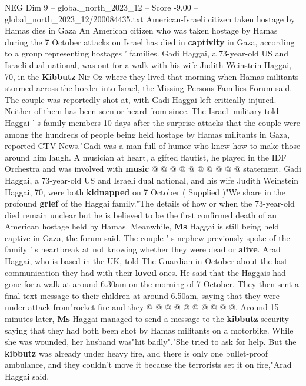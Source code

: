 \begin{textsample}{NEG Dim 9 – global\_north\_2023\_12 – Score -9.00 – global\_north\_2023\_12/200084435.txt}  \label{ex:f9_neg_071}
American-Israeli citizen taken hostage by Hamas dies in Gaza An American citizen who was taken hostage by Hamas during the 7 October attacks on Israel has died in \textbf{captivity} in Gaza, according to a group representing hostages ' families.
Gadi Haggai, a 73-year-old US and Israeli dual national, was out for a walk with his wife Judith Weinstein Haggai, 70, in the \textbf{Kibbutz} Nir Oz where they lived that morning when Hamas militants stormed across the border into Israel, the Missing Persons Families Forum said.
The couple was reportedly shot at, with Gadi Haggai left critically injured.
Neither of them has been seen or heard from since.
The Israeli military told Haggai ' s family members 10 days after the surprise attacks that the couple were among the hundreds of people being held hostage by Hamas militants in Gaza, reported CTV News."Gadi was a man full of humor who knew how to make those around him laugh.
A musician at heart, a gifted flautist, he played in the IDF Orchestra and was involved with \textbf{music} @ @ @ @ @ @ @ @ @ @ statement.
Gadi Haggai, a 73-year-old US and Israeli dual national, and his wife Judith Weinstein Haggai, 70, were both \textbf{kidnapped} on 7 October ( Supplied )"We share in the profound \textbf{grief} of the Haggai family."The details of how or when the 73-year-old died remain unclear but he is believed to be the first confirmed death of an American hostage held by Hamas.
Meanwhile, \textbf{Ms} Haggai is still being held captive in Gaza, the forum said.
The couple ' s nephew previously spoke of the family ' s heartbreak at not knowing whether they were dead or \textbf{alive}.
Arad Haggai, who is based in the UK, told The Guardian in October about the last communication they had with their \textbf{loved} ones.
He said that the Haggais had gone for a walk at around 6.30am on the morning of 7 October.
They then sent a final text message to their children at around 6.50am, saying that they were under attack from"rocket fire and they @ @ @ @ @ @ @ @ @ @.
Around 15 minutes later, \textbf{Ms} Haggai managed to send a message to the \textbf{kibbutz} security saying that they had both been shot by Hamas militants on a motorbike.
While she was wounded, her husband was"hit badly"."She tried to ask for help.
But the \textbf{kibbutz} was already under heavy fire, and there is only one bullet-proof ambulance, and they couldn't move it because the terrorists set it on fire,"Arad Haggai said.

\end{textsample}
